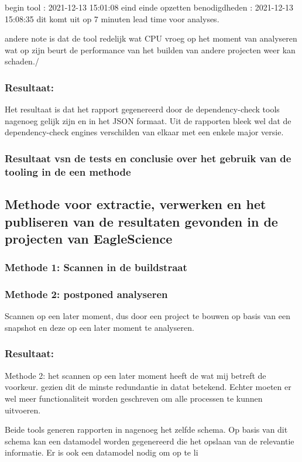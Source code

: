 begin tool : 2021-12-13 15:01:08
eind einde opzetten benodigdheden : 2021-12-13 15:08:35
dit komt uit op 7 minuten lead time voor analyses.

andere note is dat de tool redelijk wat CPU vroeg op het moment van analyseren wat op zijn beurt de performance van het builden van andere projecten weer kan schaden./

\subsubsection{Resultaat:} Het resultaat is dat het rapport gegenereerd door de dependency-check tools nagenoeg gelijk zijn en in het JSON formaat. Uit de rapporten bleek wel dat de dependency-check engines verschilden van elkaar met een enkele major versie.

\subsubsection{Resultaat vsn de tests en conclusie over het gebruik van de tooling in de een methode}

\subsection{Methode voor extractie, verwerken en het publiseren van de resultaten gevonden in de projecten van EagleScience}\label{subsec:methodeSOUPES}

\subsubsection{Methode 1: Scannen in de buildstraat}

\subsubsection{Methode 2: postponed analyseren}
Scannen op een later moment, dus door een project te bouwen op basis van een snapshot en deze op een later moment te analyseren.

\subsubsection{Resultaat:} Methode 2: het scannen op een later moment heeft de wat mij betreft de voorkeur. gezien dit de minste redundantie in datat betekend. Echter moeten er wel meer functionaliteit worden geschreven om alle processen te kunnen uitvoeren.

Beide tools generen rapporten in nagenoeg het zelfde schema. Op basis van dit schema kan een datamodel worden gegenereerd die het opslaan van de relevantie informatie. Er is ook een datamodel nodig om op te li


